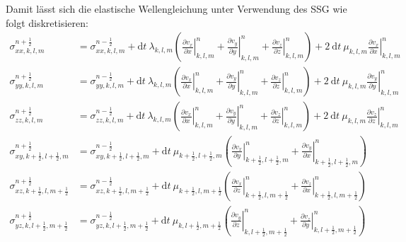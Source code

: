 \documentclass[pdftex,a4paper,parskip,listof=totoc,bibliography=totoc,onehalfspacing,12pt]{scrreprt}
\begin{document}
Damit lässt sich die elastische Wellengleichung unter Verwendung des SSG wie folgt diskretisieren:
\begin{align*}
	\sigma_{xx,k,l,m}^{n+\frac{1}{2}} &= \sigma_{xx,k,l,m}^{n-\frac{1}{2}} + \mathrm{d}t~ \lambda_{k,l,m} \left( \left.\frac{\partial v_x}{\partial x}\right\rvert_{k,l,m}^n + \left.\frac{\partial v_y}{\partial y}\right\rvert_{k,l,m}^n + \left.\frac{\partial v_z}{\partial z}\right\rvert_{k,l,m}^n \right) + 2~ \mathrm{d}t ~\mu_{k,l,m} \left.\frac{\partial v_x}{\partial x}\right\rvert_{k,l,m}^n\\
	\sigma_{yy,k,l,m}^{n+\frac{1}{2}} &= \sigma_{yy,k,l,m}^{n-\frac{1}{2}} + \mathrm{d}t~ \lambda_{k,l,m} \left( \left.\frac{\partial v_x}{\partial x}\right\rvert_{k,l,m}^n + \left.\frac{\partial v_y}{\partial y}\right\rvert_{k,l,m}^n + \left.\frac{\partial v_z}{\partial z}\right\rvert_{k,l,m}^n \right) + 2~ \mathrm{d}t ~\mu_{k,l,m} \left.\frac{\partial v_y}{\partial y}\right\rvert_{k,l,m}^n\\
	\sigma_{zz,k,l,m}^{n+\frac{1}{2}} &= \sigma_{zz,k,l,m}^{n-\frac{1}{2}} + \mathrm{d}t~ \lambda_{k,l,m} \left( \left.\frac{\partial v_x}{\partial x}\right\rvert_{k,l,m}^n + \left.\frac{\partial v_y}{\partial y}\right\rvert_{k,l,m}^n + \left.\frac{\partial v_z}{\partial z}\right\rvert_{k,l,m}^n \right) + 2~ \mathrm{d}t ~\mu_{k,l,m} \left.\frac{\partial v_z}{\partial z}\right\rvert_{k,l,m}^n\\
	\sigma_{xy,k+\frac{1}{2},l+\frac{1}{2},m}^{n+\frac{1}{2}} &= \sigma_{xy,k+\frac{1}{2},l+\frac{1}{2},m}^{n-\frac{1}{2}} + \mathrm{d}t~ \mu_{k+\frac{1}{2},l+\frac{1}{2},m} \left( \left.\frac{\partial v_x}{\partial y}\right\rvert_{k+\frac{1}{2},l+\frac{1}{2},m}^n + \left.\frac{\partial v_y}{\partial x}\right\rvert_{k+\frac{1}{2},l+\frac{1}{2},m}^n \right)\\
	\sigma_{xz,k+\frac{1}{2},l,m+\frac{1}{2}}^{n+\frac{1}{2}} &= \sigma_{xz,k+\frac{1}{2},l,m+\frac{1}{2}}^{n-\frac{1}{2}} + \mathrm{d}t~ \mu_{k+\frac{1}{2},l,m+\frac{1}{2}} \left( \left.\frac{\partial v_x}{\partial z}\right\rvert_{k+\frac{1}{2},l,m+\frac{1}{2}}^n + \left.\frac{\partial v_z}{\partial x}\right\rvert_{k+\frac{1}{2},l,m+\frac{1}{2}}^n \right)\\
	\sigma_{yz,k,l+\frac{1}{2},m+\frac{1}{2}}^{n+\frac{1}{2}} &= \sigma_{yz,k,l+\frac{1}{2},m+\frac{1}{2}}^{n-\frac{1}{2}} + \mathrm{d}t~ \mu_{k,l+\frac{1}{2},m+\frac{1}{2}} \left( \left.\frac{\partial v_y}{\partial z}\right\rvert_{k,l+\frac{1}{2},m+\frac{1}{2}}^n + \left.\frac{\partial v_z}{\partial y}\right\rvert_{k,l+\frac{1}{2},m+\frac{1}{2}}^n \right)\\

\end{align*}
\end{document}
